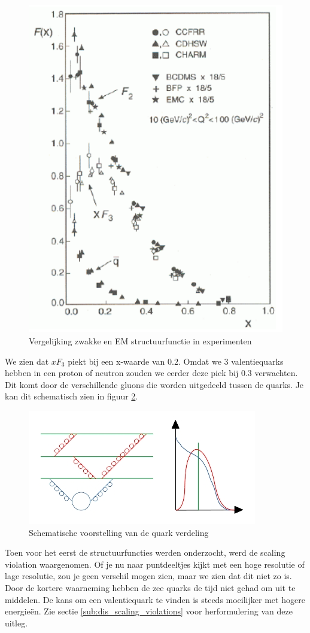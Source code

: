 \documentclass[../main.tex]{subfiles}
\begin{document}
\begin{figure}[h]
    \centering
    \includegraphics[width=0.4\linewidth]{DIS_nucleon_structuur_pdf/neutr_scat_exp.png}
    \caption{Vergelijking zwakke en EM structuurfunctie in experimenten}%
    \label{fig:neutr_scat_exp}
\end{figure}

We zien dat $xF_3$ piekt bij een x-waarde van $0.2$. Omdat we 3 valentiequarks hebben in een proton of neutron zouden we eerder deze piek bij $0.3$ verwachten. Dit komt door de verschillende gluons die worden uitgedeeld tussen de quarks. Je kan dit schematisch zien in figuur \ref{fig:valance_quark_dist}.
 
\begin{figure}[h]
    \centering
    \includegraphics[width=0.8\linewidth]{DIS_nucleon_structuur_pdf/valance_quark_dist.jpg}
    \caption{Schematische voorstelling van de quark verdeling}%
    \label{fig:valance_quark_dist}
\end{figure}

Toen voor het eerst de structuurfuncties werden onderzocht, werd de scaling violation waargenomen. Of je nu naar puntdeeltjes kijkt met een hoge resolutie of lage resolutie, zou je geen verschil mogen zien, maar we zien dat dit niet zo is. Door de kortere waarneming hebben de zee quarks de tijd niet gehad om uit te middelen. De kans om een valentiequark te vinden is steeds moeilijker met hogere energieën. Zie sectie \ref{sub:dis_scaling_violations} voor herformulering van deze uitleg.
\end{document}
